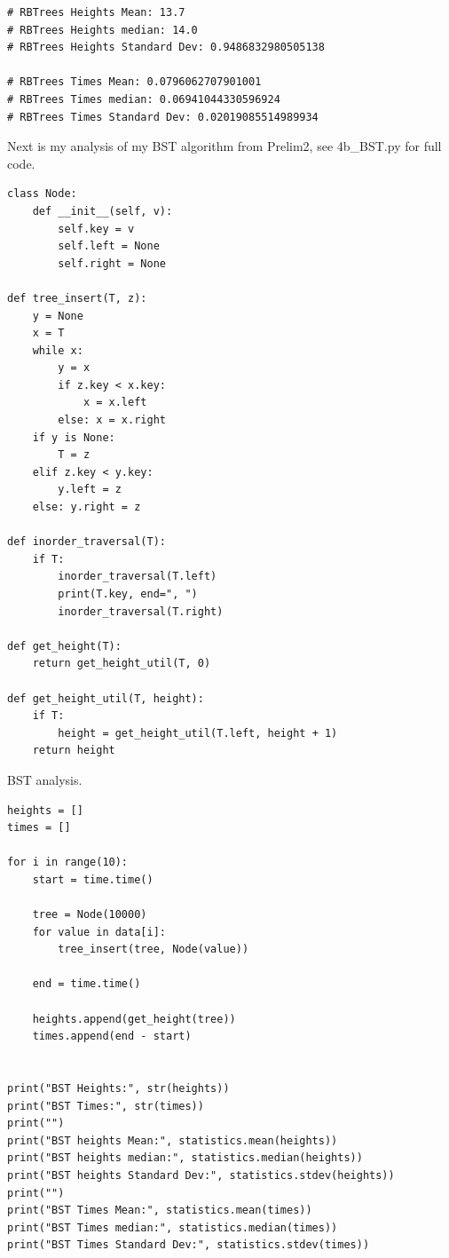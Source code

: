 \documentclass{article}
\begin{document}
\begin{enumerate}
\begin{enumerate}
\begin{lstlisting}
# RBTrees Heights Mean: 13.7
# RBTrees Heights median: 14.0
# RBTrees Heights Standard Dev: 0.9486832980505138

# RBTrees Times Mean: 0.0796062707901001
# RBTrees Times median: 0.06941044330596924
# RBTrees Times Standard Dev: 0.02019085514989934
      \end{lstlisting}

      Next is my analysis of my BST algorithm from Prelim2, see 4b\_BST.py for full code.

    \begin{lstlisting}
class Node: 
    def __init__(self, v): 
        self.key = v 
        self.left = None
        self.right = None
                
def tree_insert(T, z): 
    y = None
    x = T
    while x:
        y = x
        if z.key < x.key:
            x = x.left
        else: x = x.right
    if y is None:
        T = z
    elif z.key < y.key:
        y.left = z
    else: y.right = z
                
def inorder_traversal(T): 
    if T: 
        inorder_traversal(T.left) 
        print(T.key, end=", ") 
        inorder_traversal(T.right)
        
def get_height(T):
    return get_height_util(T, 0)

def get_height_util(T, height):
    if T:
        height = get_height_util(T.left, height + 1)
    return height
    \end{lstlisting}

    BST analysis.

    \begin{lstlisting}
heights = []
times = []

for i in range(10):
    start = time.time()
    
    tree = Node(10000)
    for value in data[i]:
        tree_insert(tree, Node(value))
    
    end = time.time()
    
    heights.append(get_height(tree))
    times.append(end - start)

    
print("BST Heights:", str(heights))
print("BST Times:", str(times))
print("")
print("BST heights Mean:", statistics.mean(heights))
print("BST heights median:", statistics.median(heights))
print("BST heights Standard Dev:", statistics.stdev(heights))
print("")
print("BST Times Mean:", statistics.mean(times))
print("BST Times median:", statistics.median(times))
print("BST Times Standard Dev:", statistics.stdev(times))


\end{lstlisting}
\end{enumerate}
\end{enumerate}
\end{document}
